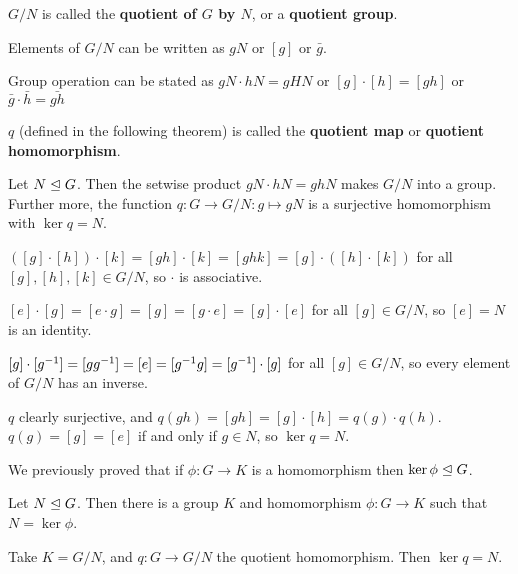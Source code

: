 $G/N$ is called the \textbf{quotient of $G$ by $N$}, or a \textbf{quotient group}. 

Elements of $G/N$ can be written as $gN$ or $[g]$ or $\bar g$. 

Group operation can be stated as $gN\cdot hN=gHN$ or $[g]\cdot [h]=[gh]$ or $\bar g\cdot \bar h = \bar{gh}$

$q$ (defined in the following theorem) is called the \textbf{quotient map} or \textbf{quotient homomorphism}.

\begin{thm}
Let $N\trianglelefteq G$. Then the setwise product $gN\cdot hN=ghN$ makes $G/N$ into a group. Further more, the function $q: G\to G/N: g\mapsto gN$ is a surjective homomorphism with $\ker q=N$.
\end{thm}

\begin{pf}
$([g]\cdot [h]) \cdot [k] = [gh]\cdot [k] = [ghk] = [g]\cdot ([h]\cdot [k])$ for all $[g],[h],[k]\in G/N$, so $\cdot$ is associative.

$[e]\cdot[g] = [e\cdot g] = [g] = [g\cdot e] = [g]\cdot [e]$ for all $[g]\in G/N$, so $[e]= N$ is an identity.

$[g]\cdot [g^{-1}] = [gg^{-1}] = [e] = [g^{-1} g] = [g^{-1} ]\cdot [g]$ for all $[g]\in G/N$, so every element of $G/N$ has an inverse.

$q$ clearly surjective, and $q(gh)= [gh] = [g]\cdot [h] = q(g) \cdot q(h)$. $q(g)=[g]=[e]$ if and only if $g\in N$, so $\ker q=N$.
\end{pf}
We previously proved that if $\phi:G\to K$ is a homomorphism then $\ker \phi \trianglelefteq G$.
\begin{corr}
Let $N\trianglelefteq G$. Then there is a group $K$ and homomorphism $\phi:G\to K$ such that $N=\ker \phi$.
\end{corr}

\begin{pf}
Take $K=G/N$, and $q:G\to G/N$ the quotient homomorphism. Then $\ker q=N$.
\end{pf}

